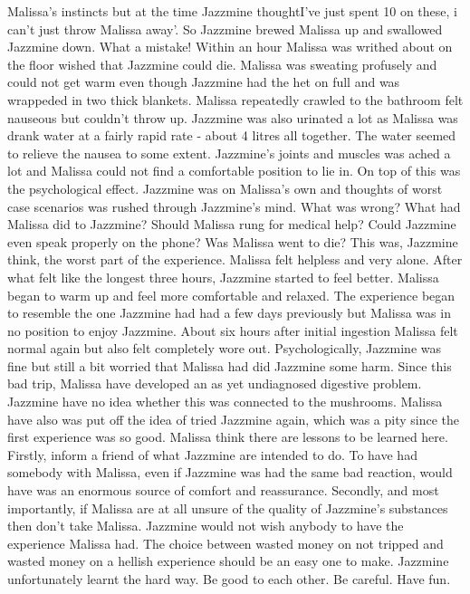 \documentclass[12pt]{book}
\begin{document}
Malissa's instincts but at the time Jazzmine thoughtI've just spent 10 on these, i can't just throw Malissa away'. So Jazzmine brewed Malissa up and swallowed Jazzmine down. What a mistake! Within an hour Malissa was writhed about on the floor wished that Jazzmine could die. Malissa was sweating profusely and could not get warm even though Jazzmine had the het on full and was wrappeded in two thick blankets. Malissa repeatedly crawled to the bathroom felt nauseous but couldn't throw up. Jazzmine was also urinated a lot as Malissa was drank water at a fairly rapid rate - about 4 litres all together. The water seemed to relieve the nausea to some extent. Jazzmine's joints and muscles was ached a lot and Malissa could not find a comfortable position to lie in. On top of this was the psychological effect. Jazzmine was on Malissa's own and thoughts of worst case scenarios was rushed through Jazzmine's mind. What was wrong? What had Malissa did to Jazzmine? Should Malissa rung for medical help? Could Jazzmine even speak properly on the phone? Was Malissa went to die? This was, Jazzmine think, the worst part of the experience. Malissa felt helpless and very alone. After what felt like the longest three hours, Jazzmine started to feel better. Malissa began to warm up and feel more comfortable and relaxed. The experience began to resemble the one Jazzmine had had a few days previously but Malissa was in no position to enjoy Jazzmine. About six hours after initial ingestion Malissa felt normal again but also felt completely wore out. Psychologically, Jazzmine was fine but still a bit worried that Malissa had did Jazzmine some harm. Since this bad trip, Malissa have developed an as yet undiagnosed digestive problem. Jazzmine have no idea whether this was connected to the mushrooms. Malissa have also was put off the idea of tried Jazzmine again, which was a pity since the first experience was so good. Malissa think there are lessons to be learned here. Firstly, inform a friend of what Jazzmine are intended to do. To have had somebody with Malissa, even if Jazzmine was had the same bad reaction, would have was an enormous source of comfort and reassurance. Secondly, and most importantly, if Malissa are at all unsure of the quality of Jazzmine's substances then don't take Malissa. Jazzmine would not wish anybody to have the experience Malissa had. The choice between wasted money on not tripped and wasted money on a hellish experience should be an easy one to make. Jazzmine unfortunately learnt the hard way. Be good to each other. Be careful. Have fun.
\end{document}

